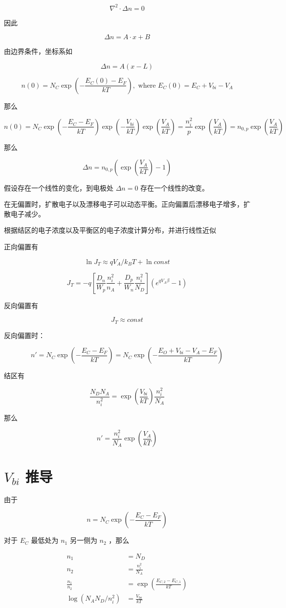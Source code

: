 \documentclass[cn,11pt,chinese,black,simple]{../elegantbook}
\begin{document}
\[\nabla^2 \cdot \Delta n = 0\]

因此 

\[\Delta n = A \cdot x + B\]

由边界条件，坐标系如


\[\Delta n = A(x - L) \]

\[n(0) = N_C \exp(- \frac{E_C(0) - E_F}{k T}), \text{ where } E_C(0) = E_C + V_{bi} - V_A\]

那么

\[n(0) = N_C \exp(-\frac{E_C-E_F}{kT}) \exp(-\frac{V_{bi}}{kT}) \exp(\frac{V_A}{kT}) = \frac{n_i^2}{p}\exp(\frac{V_A}{kT}) = n_{0,p}\exp(\frac{V_A}{kT})\]

那么 

\[\Delta n = n_{0,p}(\exp(\frac{V_A}{kT}) - 1)\]

假设存在一个线性的变化，到电极处 \(\Delta n = 0\) 存在一个线性的改变。


在无偏置时，扩散电子以及漂移电子可以动态平衡。正向偏置后漂移电子增多，扩散电子减少。

根据结区的电子浓度以及平衡区的电子浓度计算分布，并进行线性近似

正向偏置有 

\[\ln J_T \approx q V_A / k_B T + \ln const\]

\[J_T = -q [\frac{D_n}{W_p}\frac{n_i^2}{n_A} + \frac{D_p}{W_n} \frac{n_i^2}{N_D}] (e^{qV_A \beta} - 1)\]

反向偏置有

\[J_T \approx const\]

反向偏置时：

\[n' = N_C \exp(-\frac{E_C - E_F}{kT}) = N_C \exp(-\frac{E_O + V_{bi} - V_A - E_F}{kT})\]

结区有

\[\frac{N_D N_A}{n_i^2} = \exp(\frac{V_{bi}}{kT}) \frac{n_i^2}{N_A}\]


那么 

\[n' = \frac{n_i^2}{N_A} \exp(\frac{V_A}{kT})\]


\section*{\(V_{bi}\) 推导}

由于 

\[n = N_C \exp(- \frac{E_C - E_F}{k T})\] 

对于 \(E_C\) 最低处为 \(n_1\) 另一侧为 \(n_2\) ，那么

\[
\begin{aligned}
    n_1 &= N_D \\
    n_2 &= \frac{n_i^2}{N_A} \\
    \frac{n_1}{n_2} &= \exp(\frac{E_{C,2} - E_{C,1}}{k T}) \\
    \log (N_A N_D / n_i^2) &= \frac{V_{bo}}{k T}
\end{aligned}    
\]

\let\chapname\undefined
\ifx\mainclass\undefined
\end{document}
